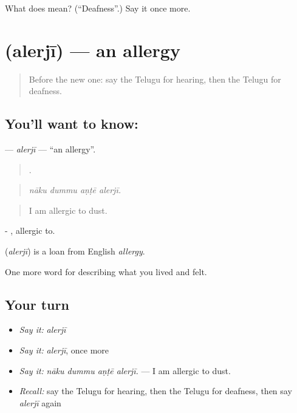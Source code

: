 \begin{tcolorbox}[breakable,colback=teal!4,colframe=teal!35!black,title={Before you move on}]
What does  mean? (\textquotedblleft{}Deafness\textquotedblright{}.) Say it once more.
\end{tcolorbox}
\section[\texorpdfstring{\te{అలెర్జీ} (alerjī)}{అలెర్జీ (alerjī)}]{ (alerjī) — an allergy}

\label{lesson:TE-C516-alerji}



\begin{quote}
Before the new one: say the Telugu for hearing, then the Telugu for deafness.
\end{quote}

\subsection*{You'll want to know: }
\textbf{} — \emph{alerjī} — \textquotedblleft{}an allergy\textquotedblright{}.

\begin{quote}
   .
\end{quote}

\begin{quote}
\emph{nāku dummu aṇṭē alerjī.}
\end{quote}

\begin{quote}
I am allergic to dust.
\end{quote}

- , allergic to.

\begin{cousinweb}
\textbf{} (\emph{alerjī}) is a loan from English \emph{allergy}.
\end{cousinweb}

\begin{grammarlens}[title={What you've built}]
One more word for describing what you lived and felt.
\end{grammarlens}

\subsection*{Your turn}
\begin{itemize}
\raggedright
  \item \emph{Say it:} \emph{alerjī}
  \item \emph{Say it:} \emph{alerjī}, once more
  \item \emph{Say it:} \emph{nāku dummu aṇṭē alerjī.} — I am allergic to dust.
  \item \emph{Recall:} say the Telugu for hearing, then the Telugu for deafness, then say \emph{alerjī} again
\end{itemize}


